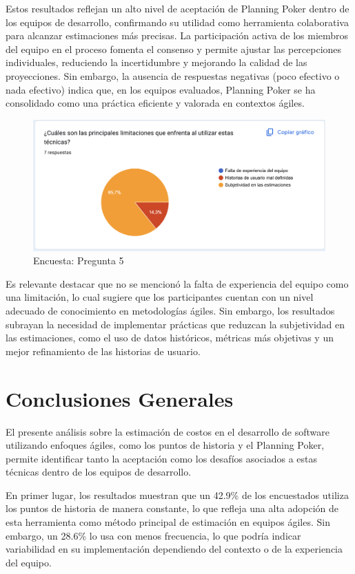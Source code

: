 Estos resultados reflejan un alto nivel de aceptación de Planning Poker dentro de los equipos de desarrollo, confirmando su utilidad como herramienta colaborativa para alcanzar estimaciones más precisas. La participación activa de los miembros del equipo en el proceso fomenta el consenso y permite ajustar las percepciones individuales, reduciendo la incertidumbre y mejorando la calidad de las proyecciones. Sin embargo, la ausencia de respuestas negativas (poco efectivo o nada efectivo) indica que, en los equipos evaluados, Planning Poker se ha consolidado como una práctica eficiente y valorada en contextos ágiles.

\FloatBarrier
\begin{figure}[h!]
    \centering
    \includegraphics[width=1\textwidth]{images/question_5.png}
    \caption{Encuesta: Pregunta 5}
    \label{fig:question_5}
\end{figure}


\FloatBarrier
Es relevante destacar que no se mencionó la falta de experiencia del equipo como una limitación, lo cual sugiere que los participantes cuentan con un nivel adecuado de conocimiento en metodologías ágiles. Sin embargo, los resultados subrayan la necesidad de implementar prácticas que reduzcan la subjetividad en las estimaciones, como el uso de datos históricos, métricas más objetivas y un mejor refinamiento de las historias de usuario.

\section{Conclusiones Generales}
El presente análisis sobre la estimación de costos en el desarrollo de software utilizando enfoques ágiles, como los puntos de historia y el Planning Poker, permite identificar tanto la aceptación como los desafíos asociados a estas técnicas dentro de los equipos de desarrollo.

En primer lugar, los resultados muestran que un 42.9\% de los encuestados utiliza los puntos de historia de manera constante, lo que refleja una alta adopción de esta herramienta como método principal de estimación en equipos ágiles. Sin embargo, un 28.6\% lo usa con menos frecuencia, lo que podría indicar variabilidad en su implementación dependiendo del contexto o de la experiencia del equipo.

